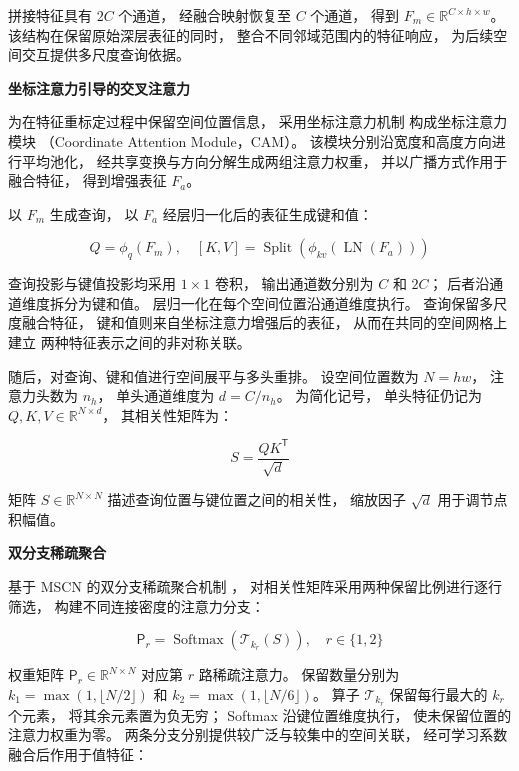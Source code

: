 拼接特征具有 \(2C\) 个通道，
经融合映射恢复至 \(C\) 个通道，
得到 \(F_m\in\mathbb{R}^{C\times h\times w}\)。
该结构在保留原始深层表征的同时，
整合不同邻域范围内的特征响应，
为后续空间交互提供多尺度查询依据。

\noindent\textbf{坐标注意力引导的交叉注意力}\par

为在特征重标定过程中保留空间位置信息，
采用坐标注意力机制
构成坐标注意力模块
（Coordinate Attention Module，CAM）。
该模块分别沿宽度和高度方向进行平均池化，
经共享变换与方向分解生成两组注意力权重，
并以广播方式作用于融合特征，
得到增强表征 \(F_a\)。

以 \(F_m\) 生成查询，
以 \(F_a\) 经层归一化后的表征生成键和值：

\begin{equation}
Q=\phi_q(F_m),\quad
[K,V]=\operatorname{Split}\left(
\phi_{kv}(\operatorname{LN}(F_a))
\right)
\label{eq:msca-qkv}
\end{equation}

查询投影与键值投影均采用 \(1\times1\) 卷积，
输出通道数分别为 \(C\) 和 \(2C\)；
后者沿通道维度拆分为键和值。
层归一化在每个空间位置沿通道维度执行。
查询保留多尺度融合特征，
键和值则来自坐标注意力增强后的表征，
从而在共同的空间网格上建立
两种特征表示之间的非对称关联。

随后，对查询、键和值进行空间展平与多头重排。
设空间位置数为 \(N=hw\)，
注意力头数为 \(n_h\)，
单头通道维度为 \(d=C/n_h\)。
为简化记号，
单头特征仍记为
\(Q,K,V\in\mathbb{R}^{N\times d}\)，
其相关性矩阵为：

\begin{equation}
S=\frac{QK^{\mathsf T}}{\sqrt{d}}
\label{eq:msca-scores}
\end{equation}

矩阵 \(S\in\mathbb{R}^{N\times N}\)
描述查询位置与键位置之间的相关性，
缩放因子 \(\sqrt{d}\) 用于调节点积幅值。

\noindent\textbf{双分支稀疏聚合}\par

基于 MSCN 的双分支稀疏聚合机制
，
对相关性矩阵采用两种保留比例进行逐行筛选，
构建不同连接密度的注意力分支：

\begin{equation}
\mathsf{P}_r=\operatorname{Softmax}\left(
\mathcal{T}_{k_r}(S)
\right),\quad r\in\{1,2\}
\label{eq:msca-sparse}
\end{equation}

权重矩阵
\(\mathsf{P}_r\in\mathbb{R}^{N\times N}\)
对应第 \(r\) 路稀疏注意力。
保留数量分别为
\(k_1=\max(1,\lfloor N/2\rfloor)\)
和 \(k_2=\max(1,\lfloor N/6\rfloor)\)。
算子 \(\mathcal{T}_{k_r}\)
保留每行最大的 \(k_r\) 个元素，
将其余元素置为负无穷；
Softmax 沿键位置维度执行，
使未保留位置的注意力权重为零。
两条分支分别提供较广泛与较集中的空间关联，
经可学习系数融合后作用于值特征：

